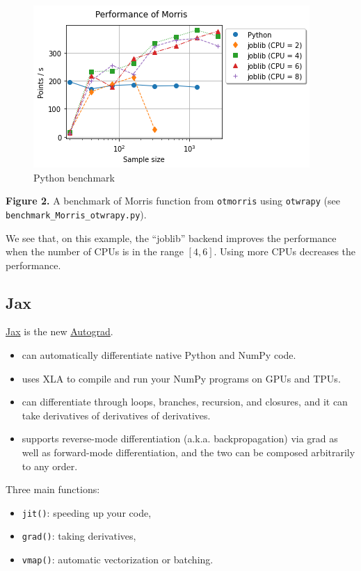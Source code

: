 \documentclass[11pt]{article}
\providecommand{\tightlist}{%
      \setlength{\itemsep}{0pt}\setlength{\parskip}{0pt}}
\begin{document}
    \begin{figure}
\centering
\includegraphics{benchmark_Morris_otwrapy.png}
\caption{Python benchmark}
\end{figure}

\textbf{Figure 2.} A benchmark of Morris function from \texttt{otmorris}
using \texttt{otwrapy} (see \texttt{benchmark\_Morris\_otwrapy.py}).

We see that, on this example, the ``joblib'' backend improves the
performance when the number of CPUs is in the range \([4, 6]\). Using
more CPUs decreases the performance.

    \hypertarget{jax}{%
\subsection{Jax}\label{jax}}

\href{https://github.com/google/jax}{Jax} is the new
\href{https://github.com/HIPS/autograd}{Autograd}.

\begin{itemize}
\tightlist
\item
  can automatically differentiate native Python and NumPy code.
\item
  uses XLA to compile and run your NumPy programs on GPUs and TPUs.
\item
  can differentiate through loops, branches, recursion, and closures,
  and it can take derivatives of derivatives of derivatives.
\item
  supports reverse-mode differentiation (a.k.a. backpropagation) via
  grad as well as forward-mode differentiation, and the two can be
  composed arbitrarily to any order.
\end{itemize}

Three main functions:

\begin{itemize}
\tightlist
\item
  \texttt{jit()}: speeding up your code,
\item
  \texttt{grad()}: taking derivatives,
\item
  \texttt{vmap()}: automatic vectorization or batching.
\end{itemize}
\end{document}
